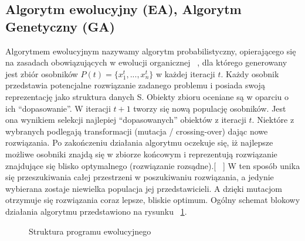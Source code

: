 \documentclass[twoside,a4paper,10]{book}
\begin{document}
    \subsection{ Algorytm ewolucyjny (EA), Algorytm Genetyczny (GA)}
Algorytmem ewolucyjnym nazywamy algorytm probabilistyczny, opierającego się na zasadach obowiązujących w ewolucji organicznej  ~\cite{genAlgWeb}, dla którego generowany jest zbiór osobników $P(t)=\lbrace x_1^t, ..., x_n^t\rbrace$ w każdej iteracji $t$. Każdy osobnik przedstawia potencjalne rozwiązanie zadanego problemu i posiada swoją reprezentację jako struktura danych S. Obiekty zbioru oceniane są w oparciu o ich “dopasowanie”. W iteracji $t+1$ tworzy się nową populację osobników. Jest ona wynikiem selekcji najlepiej “dopasowanych” obiektów z iteracji $t$. Niektóre z wybranych podlegają transformacji (mutacja / crossing-over) dając nowe rozwiązania. Po zakończeniu działania algorytmu oczekuje się, iż najlepsze możliwe osobniki znajdą się w zbiorze końcowym i reprezentują rozwiązanie znajdujące się blisko optymalnego (rozwiązanie rozsądne).[ ~\cite{algBook}] W ten sposób unika się przeszukiwania całej przestrzeni w poszukiwaniu rozwiązania, a jedynie wybierana zostaje niewielka populacja jej przedstawicieli. A dzięki mutacjom otrzymuje się rozwiązania coraz lepsze, bliskie optimum.  Ogólny schemat blokowy działania algorytmu przedstawiono na rysunku ~\ref{fig:algSchem}.

\begin{figure}[!h]
		\centering
		\caption{Struktura programu ewolucyjnego}
		\label{fig:algSchem}
\end{figure}
\end{document}
